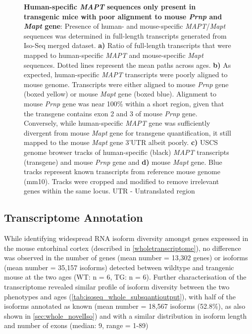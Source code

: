 \begin{figure}[htp]
	{\textbf{Human-specific \textit{MAPT} sequences only present in transgenic mice with poor alignment to mouse \textit{Prnp} and \textit{Mapt} gene}: Presence of human- and mouse-specific \textit{MAPT}/\textit{Mapt} sequences was determined in full-length transcripts generated from Iso-Seq merged dataset. \textbf{a)} Ratio of full-length transcripts that were mapped to human-specific \textit{MAPT} and mouse-specific \textit{Mapt} sequences. Dotted lines represent the mean paths across ages. \textbf{b)} As expected, human-specific \textit{MAPT} transcripts were poorly aligned to mouse genome. Transcripts were either aligned to mouse \textit{Prnp} gene (boxed yellow) or  mouse \textit{Mapt} gene (boxed blue). Alignment to mouse \textit{Prnp} gene was near 100\% within a short region, given that the transgene contains exon 2 and 3 of mouse \textit{Prnp} gene\cite{Ramsden2005}. Conversely, while human-specific \textit{MAPT} gene was sufficiently divergent from mouse \textit{Mapt} gene for transgene quantification, it still mapped to the mouse \textit{Mapt} gene 3'UTR albeit poorly. \textbf{c)} USCS genome browser tracks of human-specific (black) \textit{MAPT} transcripts (transgene) and mouse \textit{Prnp} gene and \textbf{d)} mouse \textit{Mapt} gene. Blue tracks represent known transcripts from reference mouse genome (mm10). Tracks were cropped and modified to remove irrelevant genes within the same locus.  UTR - Untranslated region}
	\label{fig:isoseq_humanmapt}
\end{figure}


\subsection{Transcriptome Annotation}
While identifying widespread RNA isoform diversity amongst genes expressed in the mouse entorhinal cortex (described in \cref{wholetranscriptome}), no difference was observed in the number of genes (mean number = 13,302 genes) or isoforms (mean number = 35,157 isoforms) detected between wildtype and trangenic mouse at the two ages (WT: n = 6, TG: n = 6). Further characterisation of the transcriptome revealed similar profile of isoform diversity between the two phenotypes and ages (\cref{tab:isoseq_whole_subsqantioutput}), with half of the isoforms annotated as known (mean number = 18,567 isoforms (52.8\%), as also shown in \cref{sec:whole_novelIso}) and with a similar distribution in isoform length and number of exons (median: 9, range = 1-89) 

